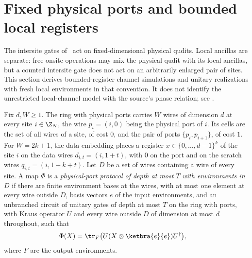 \section{Fixed physical ports and bounded local registers}

The intersite gates of~\cite[Supplement, pp.~7--8]{Piroli2021LOCC}
act on fixed-dimensional physical qudits. Local ancillas are separate:
free onsite operations may mix the physical qudit with its local ancillas,
but a counted intersite gate does not act on an arbitrarily enlarged pair
of sites. This section derives bounded-register channel simulations and
unitary realizations with fresh local environments in that convention.
It does not identify the unrestricted local-channel model with the source's phase relation; see
\cite{gap:psc21_physical_port_simulation_scope}.

\begin{definition}
    \label{def:qc_physical_port_protocol}
    \leanok
    Fix $d,W\ge1$. The ring with physical ports carries $W$ wires of dimension $d$ at every
    site $i\in\Z_N$, the wire $p_i=(i,0)$ being the physical port of $i$. Its cells are the set
    of all wires of a site, of cost $0$, and the pair of ports $\{p_i,p_{i+1}\}$, of cost $1$.
    For $W=2k+1$, the data embedding places a register $x\in\{0,\dots,d-1\}^k$ of the site $i$
    on the data wires $d_{i,t}=(i,1+t)$, with $0$ on the port and on the scratch wires
    $q_{i,t}=(i,1+k+t)$. Let $D$ be a set of wires containing a wire of every site. A map
    $\Phi$ is a \emph{physical-port protocol of depth at most $T$ with environments in $D$} if
    there are finite environment bases at the wires, with at most one element at every wire
    outside $D$, basis vectors $e$ of the input environments, and an unbranched circuit of
    unitary gates of depth at most $T$ on the ring with ports, with Kraus operator $U$ and every
    wire outside $D$ of dimension at most $d$ throughout, such that
    \begin{align}
        \Phi(X) & =\tr_F\bigl(U(X\otimes\ketbra{e}{e})U^\dagger\bigr),\notag
    \end{align}
    where $F$ are the output environments.
\end{definition}

